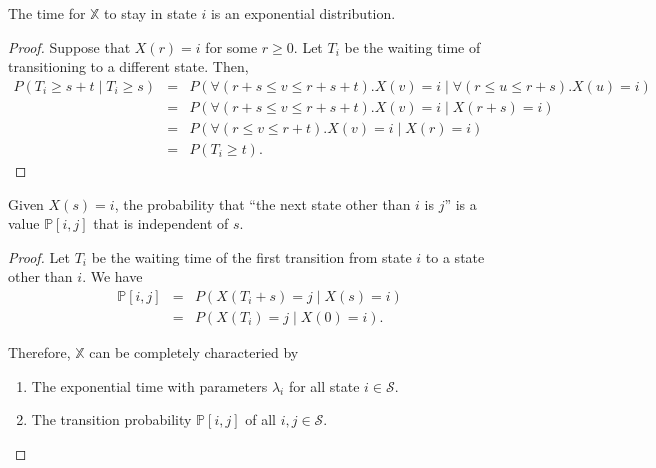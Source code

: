 \begin{observation}
The time for $ \mathbb{X} $ to stay in state $ i $ is an exponential distribution.
\begin{proof}
Suppose that $ X(r) = i $ for some $ r \ge 0 $.
Let $ T_{i} $ be the waiting time of transitioning to a different state. Then,
\begin{eqnarray*}
P(T_{i} \ge s + t \mid T_{i} \ge s)
  & = & P(\forall(r + s \le v \le r + s + t).X(v) = i \mid \forall(r \le u \le r + s).X(u) = i) \\
  & = & P(\forall(r + s \le v \le r + s + t).X(v) = i \mid X(r + s) = i) \\
  & = & P(\forall(r \le v \le r + t).X(v) = i \mid X(r) = i) \\
  & = & P(T_{i} \ge t).
\end{eqnarray*}
\end{proof}
\begin{comment}
\begin{alignat*}{3}
  & P(T_{i} \ge t)
    & \quad=\quad & P(T_{i} \ge s + t \mid T_{i} \ge s) \\
  & & \quad=\quad & \frac{P(T_{i} \ge s + t, T_{i} \ge s)}{P(T_{i} \ge s)} \\
  & & \quad=\quad & \frac{P(T_{i} \ge s + t)}{P(T_{i} \ge s)}, \\
\Rightarrow\quad
  & P(T_{i} \ge s + t)
    & \quad=\quad & P(T_{i} \ge s) \cdot P(T_{i} \ge t).
\end{alignat*}
It is satisfied when $ X $ is exponentially distributed (for $ e^{-\lambda_{i}(s + t)} = e^{-\lambda_{i} s} \cdot e^{-\lambda_{i} t} $).

我們稱這個 exponential distribution 的參數為 $ \lambda_{i} $。
\end{comment}
\end{observation}

\begin{observation}
Given $ X(s) = i $, the probability that ``the next state other than $ i $ is $ j $'' is a value $ \mathbb{P}[i, j] $ that is independent of $ s $.
\begin{proof}
Let $ T_{i} $ be the waiting time of the first transition from state $ i $ to a state other than $ i $. We have
\begin{eqnarray*}
\mathbb{P}[i, j]
  & = & P(X(T_{i} + s) = j \mid X(s) = i) \\
  & = & P(X(T_{i}) = j \mid X(0) = i).
\end{eqnarray*}

Therefore, $ \mathbb{X} $ can be completely characteried by
\begin{enumerate}
  \item The exponential time with parameters $ \lambda_{i} $ for all state $ i \in \mathcal{S} $.
  \item The transition probability $ \mathbb{P}[i, j] $ of all $ i, j \in \mathcal{S} $.
\end{enumerate}
\end{proof}
\end{observation}

